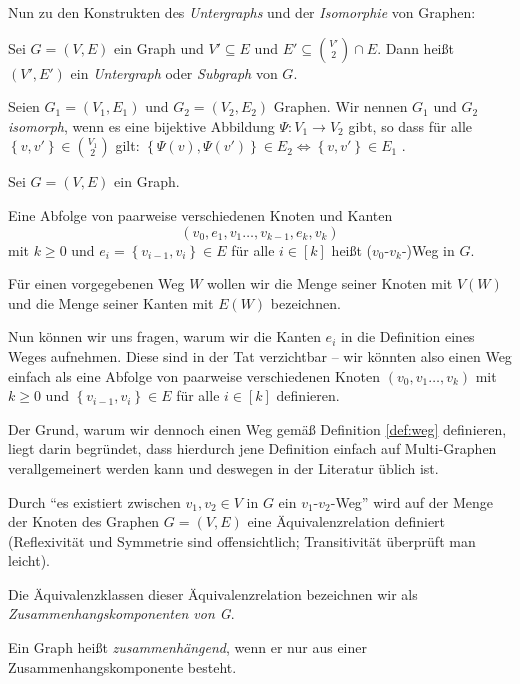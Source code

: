 \documentclass[10p,a4paper,BCOR = 12mm, DIV=15]{scrbook}
\begin{document}
Nun zu den Konstrukten des \emph{Untergraphs} und der \emph{Isomorphie} von Graphen:

\begin{Def}
Sei $G=(V, E)$ ein Graph und $V' \subseteq E$ und $E' \subseteq {V' \choose 2} \cap E$. Dann heißt $\left(V', E'\right)$ ein \emph{Untergraph} oder \emph{Subgraph} von $G$.
\end{Def}

\begin{Def}
Seien $G_1=(V_1, E_1)$ und $G_2=(V_2, E_2)$ Graphen. Wir nennen $G_1$ und $G_2$ \emph{isomorph}, wenn es eine bijektive Abbildung $\Psi : V_1 \rightarrow V_2$ gibt, so dass für alle $\left\{v, v'\right\} \in {V_1 \choose 2}$ gilt: $\left\{\Psi\left(v\right), \Psi\left(v'\right)\right\} \in E_2 \Leftrightarrow \left\{v, v'\right\} \in E_1$ .
\end{Def}

\begin{Def}
\label{def:weg}
Sei $G=(V, E)$ ein Graph.

Eine Abfolge von paarweise verschiedenen Knoten und Kanten
\begin{displaymath}
\left(v_0, e_1, v_1 \ldots, v_{k-1}, e_k, v_k\right)
\end{displaymath}
mit $k \geq 0$ und $e_i = \left\{v_{i-1}, v_i\right\} \in E$ für alle $i \in \left[k\right]$ heißt ($v_0$-$v_k$-)Weg in $G$.

Für einen vorgegebenen Weg $W$ wollen wir die Menge seiner Knoten mit $V\left(W\right)$  und die Menge seiner Kanten mit $E\left(W\right)$ bezeichnen.
\end{Def}

\begin{Bem}
Nun können wir uns fragen, warum wir die Kanten $e_i$ in die Definition eines Weges aufnehmen. Diese sind in der Tat verzichtbar -- wir könnten also einen Weg einfach als eine Abfolge von paarweise verschiedenen Knoten $\left(v_0, v_1 \ldots, v_k\right)$ mit $k \geq 0$ und $\left\{v_{i-1}, v_i\right\} \in E$ für alle $i \in \left[k\right]$ definieren.

Der Grund, warum wir dennoch einen Weg gemäß Definition \ref{def:weg} definieren, liegt darin begründet, dass hierdurch jene Definition einfach auf Multi-Graphen verallgemeinert werden kann und deswegen in der Literatur üblich ist.
\end{Bem}

\begin{Def}
Durch "`es existiert zwischen $v_1, v_2 \in V$ in $G$ ein $v_1$-$v_2$-Weg"' wird auf der Menge der Knoten des Graphen $G=\left(V, E\right)$ eine Äquivalenzrelation definiert (Reflexivität und Symmetrie sind offensichtlich; Transitivität überprüft man leicht).

Die Äquivalenzklassen dieser Äquivalenzrelation bezeichnen wir als \emph{Zusammenhangskomponenten von G}.

Ein Graph heißt \emph{zusammenhängend}, wenn er nur aus einer Zusammenhangskomponente besteht.
\end{Def}
\end{document}
